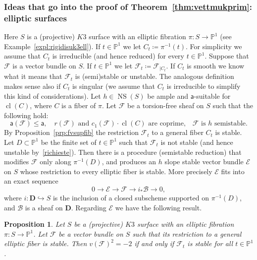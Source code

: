 \documentclass[11pt]{amsart}
\newcommand{\PP}{{\mathbb P}}
\let\mathcal\mathscr
\def\cB{\mathcal{B}}
\def\cE{\mathcal{E}}
\def\cF{\mathcal{F}}
\def\bD{\ensuremath{\mathbf D}}
\DeclareMathOperator{\cl}{cl}
\DeclareMathOperator{\NS}{NS}
\def\lra{\longrightarrow}
\def\hra{\hookrightarrow}
\newtheorem{prp}[lmm]{Proposition}
\theoremstyle{definition}
\theoremstyle{remark}
\begin{document}
\subsubsection{Ideas that go into the proof of Theorem~\ref{thm:vettmukprim}: elliptic surfaces}\label{subsubsec:disegnodimuno}
%
Here $S$ is a (projective) $K3$ surface with an elliptic fibration $\pi\colon S\to\PP^1$ (see Example~\ref{expl:rigidisuk3ell}).
 If $t\in \PP^1$ we let 
$C_t\coloneqq \pi^{-1}(t)$. 
For simplicity we assume that 
$C_t$ is irreducible (and hence reduced) for every $t\in\PP^1$. 
Suppose that $\cF$ is a vector bundle on $S$. If $t\in \PP^1$ we let 
$\cF_t\coloneqq \cF_{|C_t}$. If $C_t$ is smooth we know what it means that $\cF_t$ is (semi)stable or unstable. The analogous definition makes sense also if $C_t$ is singular (we assume that $C_t$ is irreducible to simplify this kind of considerations). 
Let $h\in\NS(S)$   be ample and ${\mathsf a}$-suitable for $\cl(C)$, where $C$ is a fiber of $\pi$.  Let $\cF$ be a torsion-free sheaf on $S$ such that the following hold:
%
\begin{equation}\label{richieste}
%
{\mathsf a}(\cF)\le {\mathsf a},\quad\text{$r(\cF)$ and $c_1(\cF)\cdot \cl(C)$ are coprime,}\quad\text{$\cF$ is $h$ semistable.}
%
\end{equation}
%
By Proposition~\ref{prp:fvsupfib} the restriction $\cF_t$ to a general fiber $C_t$ is stable. Let $D\subset\PP^1$ be the finite set of $t\in\PP^1$ such that $\cF_t$  is not stable (and hence unstable by~\eqref{richieste}).
Then there is a procedure (semistable reduction) that modifies $\cF$ only along  $\pi^{-1}(D)$, and produces an $h$ slope stable vector bundle $\cE$ on $S$ whose restriction to every elliptic fiber is stable. More precisely $\cE$ fits into an exact sequence
%
\begin{equation}\label{daeffeae}
%
0\lra \cE\lra \cF\lra i_{*}\cB\lra 0,
%
\end{equation}
%
where $i\colon\bD\hra S$ is the inclusion of a closed subscheme supported on $\pi^{-1}(D)$, and $\cB$ is a sheaf on $\bD$. 
Regarding $\cE$ we have the following result.
%
\begin{prp}
%
Let $S$ be a (projective) $K3$ surface with an elliptic fibration $\pi\colon S\to\PP^1$. Let  $\cF$ be a vector bundle on $S$ such that its restriction to a general elliptic fiber is stable. Then  $v(\cF)^2=-2$ if and only if  
$\cF_t$ is stable for all $t\in\PP^1$.  
%
\end{prp}
%
%
\end{document}
